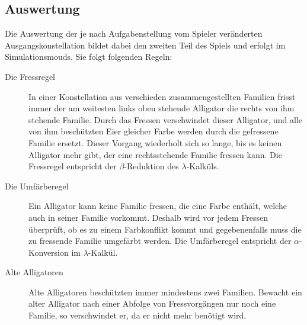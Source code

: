 \subsection{Auswertung}
Die Auswertung der je nach Aufgabenstellung vom Spieler veränderten Ausgangskonstellation bildet dabei den zweiten Teil des Spiels und erfolgt im Simulationsmouds. 
Sie folgt folgenden Regeln:

\begin{description}
                \item[Die Fressregel] In einer Konstellation aus verschieden zusammengestellten Familien frisst immer der am weitesten links oben stehende Alligator die rechts von ihm stehende Familie.
                Durch das Fressen verschwindet dieser Alligator, und alle von ihm beschützten Eier gleicher Farbe werden durch die gefressene Familie ersetzt.
                Dieser Vorgang wiederholt sich so lange, bis es keinen Alligator mehr gibt, der eine rechtsstehende Familie fressen kann.
                Die Fressregel entspricht der \(\beta\)-Reduktion des \(\lambda\)-Kalküls.

                \item[Die Umfärberegel] Ein Alligator kann keine Familie fressen, die eine Farbe enthält, welche auch in seiner Familie vorkommt.
                Deshalb wird vor jedem Fressen überprüft, ob es zu einem Farbkonflikt kommt und gegebenenfalls muss die zu fressende Familie umgefärbt werden.
                Die Umfärberegel entspricht der \(\alpha\)-Konversion im \(\lambda\)-Kalkül.

                \item[Alte Alligatoren] Alte Alligatoren beschützten immer mindestens zwei Familien.
                Bewacht ein alter Alligator nach einer Abfolge von Fressvorgängen nur noch eine Familie, so verschwindet er, da er nicht mehr benötigt wird.

        \end{description}
